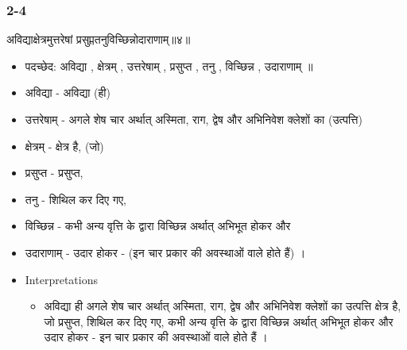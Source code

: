 \begin{frame}[fragile]\frametitle{2-4}
\begin{sanskrit}
अविद्याक्षेत्रमुत्तरेषां प्रसुप्ततनुविच्छिन्नोदाराणाम्॥४॥
\end{sanskrit}

	\begin{itemize}
	\item पदच्छेद: अविद्या , क्षेत्रम् , उत्तरेषाम् , प्रसुप्त , तनु , विच्छिन्न , उदाराणाम् ॥
	\item अविद्या - अविद्या (ही)
	\item उत्तरेषाम् - अगले शेष चार अर्थात् अस्मिता, राग, द्वेष और अभिनिवेश क्लेशों का (उत्पत्ति)
	\item क्षेत्रम् - क्षेत्र है, (जो)
	\item प्रसुप्त - प्रसुप्त,
	\item तनु - शिथिल कर दिए गए,
	\item विच्छिन्न - कभी अन्य वृत्ति के द्वारा विच्छिन्न अर्थात् अभिभूत होकर और
	\item उदाराणाम् - उदार होकर - (इन चार प्रकार की अवस्थाओं वाले होते हैं) ।	
	\item Interpretations
		\begin{itemize}
		\item अविद्या ही अगले शेष चार अर्थात् अस्मिता, राग, द्वेष और अभिनिवेश क्लेशों का उत्पत्ति क्षेत्र है, जो प्रसुप्त, शिथिल कर दिए गए, कभी अन्य वृत्ति के द्वारा विच्छिन्न अर्थात् अभिभूत होकर और उदार होकर - इन चार प्रकार की अवस्थाओं वाले होते हैं ।
		\end{itemize}
	\end{itemize}
	
\end{frame}


